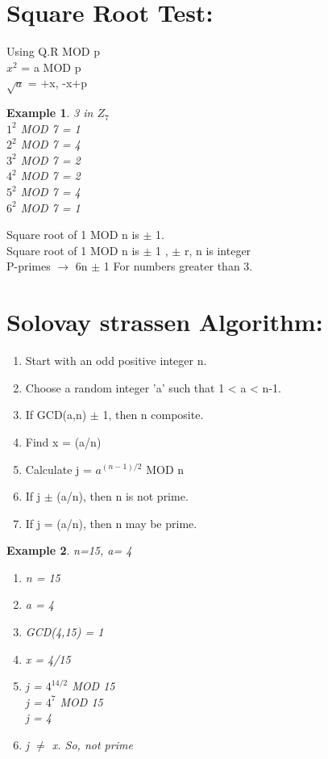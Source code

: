 \documentclass{article}
\newtheorem{ex}{Example}[section]
\begin{document}
\section{Square Root Test:}
Using Q.R MOD p
\\ $x^{2}$ = a MOD p
\\ $\sqrt a$ = +x, -x+p
\begin{ex}
3 in $Z_7$
\\ $1^{2}$ MOD 7 = 1
\\ $2^{2}$ MOD 7 = 4
\\ $3^{2}$ MOD 7 = 2
\\ $4^{2}$ MOD 7 = 2
\\ $5^{2}$ MOD 7 = 4
\\ $6^{2}$ MOD 7 = 1

\end{ex}
Square root of 1 MOD n is $\pm$ 1.
\\ Square root of 1 MOD n is $\pm$ 1 , $\pm$ r, n is integer
\\ P-primes $\longrightarrow$ 6n $\pm$ 1 For numbers greater than 3.
\section{Solovay strassen Algorithm:}
\begin{enumerate}
    \item Start with an odd positive integer n.
    \item Choose a random integer 'a' such that 1 < a < n-1.
    \item If GCD(a,n) $\pm$ 1, then n composite.
    \item Find x = (a/n)
    \item Calculate j = $a^{(n-1)/2}$ MOD n
    \item If j $\pm$ (a/n), then n is not prime.
    \item If j = (a/n), then n may be prime.
\end{enumerate}
\begin{ex}
n=15, a= 4
\begin{enumerate}
    \item n = 15
    \item a = 4
    \item GCD(4,15) = 1
    \item x = 4/15
    \item j = $4^{14/2}$ MOD 15
    \\j = $4^{7}$ MOD 15
    \\j = 4
    \item j $\neq$ x. So, not prime
\end{enumerate}
\end{ex}
\end{document}

